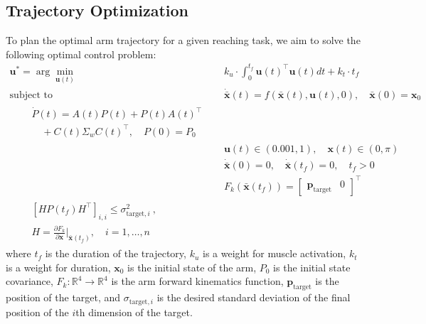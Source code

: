 \documentclass[letterpaper, 10pt, conference]{ieeeconf}
\begin{document}
\subsection{Trajectory Optimization}
To plan the optimal arm trajectory for a given reaching task, we aim to solve the following optimal control problem:
\begin{align}
    \mathbf{u}^* = \arg\min_{\mathbf{u}(t)} &\quad k_u \cdot \int_0^{t_f} \mathbf{u}(t)^\top \mathbf{u}(t) dt + k_t \cdot t_f \label{eq:cost} \\
    \text{subject to} &\quad \mathbf{\dot{\bar{x}}}(t) = f(\mathbf{\bar{x}}(t), \mathbf{u}(t), 0), \quad \mathbf{\bar{x}}(0) = \mathbf{x}_0 \label{eq:dynamics_constraint} \\
    \begin{split}
    &\quad \dot{P}(t) = A(t)P(t) + P(t)A(t)^\top \\
    &\quad \quad + C(t) \Sigma_w C(t)^\top, \quad P(0) = P_0 
    \end{split}\label{eq:dynamics_constraint_p} \\
    &\quad \mathbf{u}(t) \in (0.001, 1), \quad \mathbf{x}(t) \in (0, \pi) \label{eq:constraints} \\
    &\quad \mathbf{\dot{\bar{x}}}(0) = 0, \quad \mathbf{\dot{\bar{x}}}(t_f) = 0, \quad t_f > 0 \label{eq:boundary_constraints} \\
    &\quad F_k(\mathbf{\bar{x}}(t_f)) = \begin{bmatrix} \mathbf{p}_{\text{target}} & 0 \end{bmatrix}^\top \label{eq:target_constraint} \\
    \begin{split}
    &\quad [HP(t_f)H^\top]_{i,i} \leq \sigma_{\text{target}, i}^2 \ , \\
    &\quad H = \frac{\partial F_k}{\partial \mathbf{x}}\bigg|_{\mathbf{\bar{x}}(t_f)}, \quad i = 1, \ldots, n 
    \end{split}\label{eq:target_variance_constraint}
\end{align}
where $t_f$ is the duration of the trajectory, $k_u$ is a weight for muscle activation, $k_t$ is a weight for duration, $\mathbf{x}_0$ is the initial state of the arm, $P_0$ is the initial state covariance, $F_k: \mathbb{R}^4 \to \mathbb{R}^4$ is the arm forward kinematics function, $\mathbf{p}_{\text{target}}$ is the position of the target, and $\sigma_{\text{target}, i}$ is the desired standard deviation of the final position of the $i$th dimension of the target.
\end{document}
